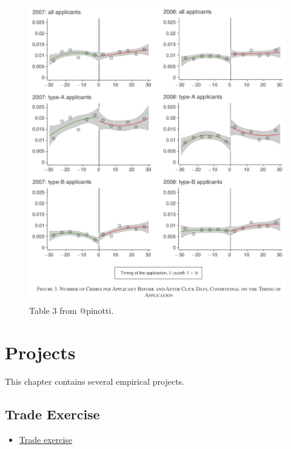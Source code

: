 \documentclass[]{book}
\providecommand{\tightlist}{%
  \setlength{\itemsep}{0pt}\setlength{\parskip}{0pt}}
\begin{document}
\begin{figure}

{\centering \includegraphics[width=19.53in]{images/pinotti2} 

}

\caption{Table 3 from @pinotti.}\label{fig:pin2}
\end{figure}

\chapter{Projects}\label{projects}

This chapter contains several empirical projects.

\section{Trade Exercise}\label{trade-exercise}

\begin{itemize}
\tightlist
\item
  \href{images/trade.html}{Trade exercise}
\end{itemize}


\end{document}

